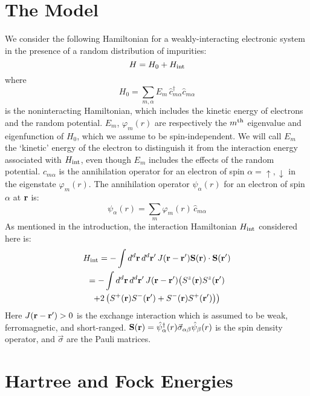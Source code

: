 \documentclass[prb,twocolumn]{revtex4}
\begin{document}
\section{The Model}
We consider the following Hamiltonian for a weakly-interacting
electronic system in the presence of a random distribution of
impurities:
\begin{equation}
H = H_{0} + H_{\rm int}
\end{equation}
where
\begin{equation}
H_{0} = \sum_{m,\alpha}E_{m}\,\hat{c}^{\dagger}_{m\alpha}\hat{c}^{}_{m\alpha}
\end{equation}
is the noninteracting Hamiltonian, which includes the kinetic
energy of electrons and the random potential. $E_{m}$, ${\varphi_m}(r)$ are
respectively the $m^{\rm th}$ eigenvalue and eigenfunction of $H_0$,
which we assume to be spin-independent. We will call $E_m$ the `kinetic' energy
of the electron to distinguish it from the interaction energy associated
with $H_{\rm int}$, even though $E_m$ includes the effects of the random potential.
$c_{m \alpha}$ is the annihilation operator for an electron of
spin $\alpha=\uparrow,\downarrow$ in the eigenstate ${\varphi_m}(r)$.
The annihilation operator $\psi_{\alpha}(r)$ for an electron of spin $\alpha$ at ${\bf r}$ is:
\begin{equation}
\psi_{\alpha}(r) = \sum_{m}\varphi_{m}(r)\,\hat{c}^{}_{m\alpha}
\end{equation}
As mentioned in the introduction, the
interaction Hamiltonian $H_{\rm int}$ considered here is:
\begin{multline}
H_{\rm int} = -\int {d^d}{\bf r}\,{d^d}{\bf r'}\, J({\bf r}-{\bf r'})
{\bf S}({\bf r}) \cdot {\bf S}({\bf r'})\\
=-\int {d^d}{\bf r}\,{d^d}{\bf r'}\, J({\bf r}-{\bf r'}) \bigl( S^{z}({\bf r})S^{z}({\bf r'})\\
+ 2\left(S^{+}({\bf r})S^{-}({\bf r'})+
S^{-}({\bf r})S^{+}({\bf r'})\right)\bigr)
\end{multline}
Here $J({\bf r}-{\bf r'})>0$ is the exchange interaction which
is assumed to be weak, ferromagnetic, and short-ranged.
${\bf S(r)}=\hat{\psi}^{\dagger}_{\alpha}(r)\vec{\sigma}_{\alpha\beta}\hat{\psi}_{\beta}(r)$
is the spin density operator, and $\vec{\sigma}$ are the Pauli matrices.


\section{Hartree and Fock Energies}
\end{document}
